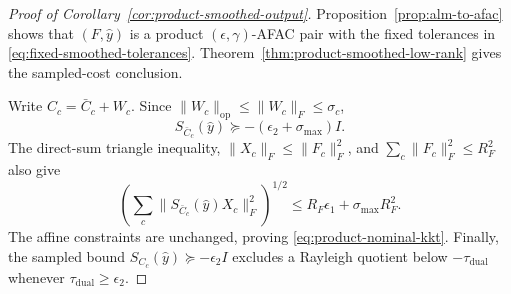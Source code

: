\documentclass[11pt]{article}
\theoremstyle{definition}
\theoremstyle{remark}
\begin{document}
\begin{proof}[Proof of Corollary~\ref{cor:product-smoothed-output}]
Proposition~\ref{prop:alm-to-afac} shows that
$(F,\widehat y)$ is a product $(\epsilon,\gamma)$-AFAC pair with the fixed
tolerances in \eqref{eq:fixed-smoothed-tolerances}.
Theorem~\ref{thm:product-smoothed-low-rank} gives the sampled-cost
conclusion.

Write $C_c=\bar C_c+W_c$.  Since
$\|W_c\|_{\mathrm{op}}\leq\|W_c\|_F\leq\sigma_c$,
\[
  S_{\bar C_c}(\widehat y)
  \succeq-(\epsilon_2+\sigma_{\max})I.
\]
The direct-sum triangle inequality,
$\|X_c\|_F\leq\|F_c\|_F^2$, and
$\sum_c\|F_c\|_F^2\leq R_F^2$ also give
\[
  \left(\sum_c
    \|S_{\bar C_c}(\widehat y)X_c\|_F^2
  \right)^{1/2}
  \leq R_F\epsilon_1+\sigma_{\max}R_F^2.
\]
The affine constraints are unchanged, proving
\eqref{eq:product-nominal-kkt}.  Finally, the sampled bound
$S_{C_c}(\widehat y)\succeq-\epsilon_2I$ excludes a Rayleigh quotient below
$-\tau_{\mathrm{dual}}$ whenever
$\tau_{\mathrm{dual}}\geq\epsilon_2$.
\end{proof}
\end{document}
